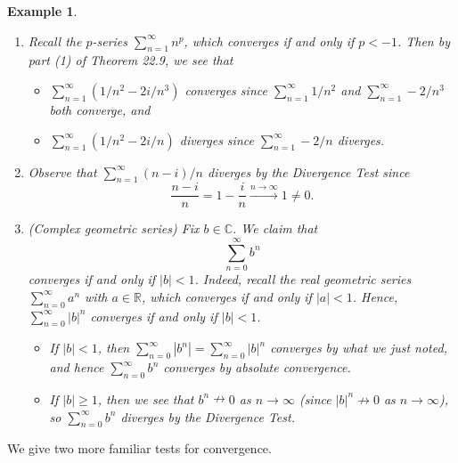 \documentclass[10pt]{article}
\newcommand{\R}{\mathbb{R}}
\newcommand{\C}{\mathbb{C}}
\theoremstyle{newstyle}
\newtheorem{exmp}[thm]{Example}
\begin{document}
\begin{exmp}~
\begin{enumerate}[(1)]
    \item Recall the $p$-series $\sum_{n=1}^\infty n^p$, which converges if and only if $p < -1$. 
    Then by part (1) of Theorem 22.9, we see that 
    \begin{itemize}
        \item $\sum_{n=1}^\infty (1/n^2 - 2i/n^3)$ converges since $\sum_{n=1}^\infty 1/n^2$ and 
        $\sum_{n=1}^\infty -2/n^3$ both converge, and 
        \item $\sum_{n=1}^\infty (1/n^2 - 2i/n)$ diverges since $\sum_{n=1}^\infty -2/n$ diverges. 
    \end{itemize}
    \item Observe that $\sum_{n=1}^\infty (n-i)/n$ diverges by the Divergence Test since 
    \[ \frac{n-i}n = 1 - \frac in \xrightarrow[]{n\to\infty} 1 \neq 0. \]
    \item (Complex geometric series) Fix $b \in \C$. We claim that 
    \[ \sum_{n=0}^\infty b^n \]
    converges if and only if $|b| < 1$. Indeed, recall the real geometric series $\sum_{n=0}^\infty a^n$ 
    with $a \in \R$, which converges if and only if $|a| < 1$. Hence, $\sum_{n=0}^\infty |b|^n$ 
    converges if and only if $|b| < 1$. 
    \begin{itemize}
        \item If $|b| < 1$, then $\sum_{n=0}^\infty |b^n| = \sum_{n=0}^\infty |b|^n$ converges
        by what we just noted, 
        and hence $\sum_{n=0}^\infty b^n$ converges by absolute convergence. 
        \item If $|b| \geq 1$, then we see that $b^n \nrightarrow 0$ as $n \to \infty$ (since 
        $|b|^n \nrightarrow 0$ as $n \to \infty$), so $\sum_{n=0}^\infty b^n$ diverges by the 
        Divergence Test. 
    \end{itemize}
\end{enumerate}
\end{exmp}

We give two more familiar tests for convergence.
\end{document}
